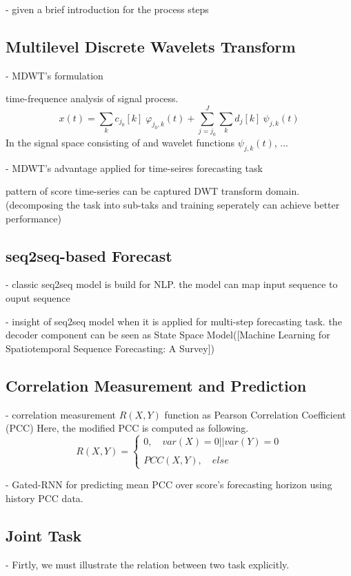 \documentclass{sigkddExp}
\begin{document}
  - given a brief introduction for the process steps


\subsection{Multilevel Discrete Wavelets Transform}

  - MDWT's formulation

time-frequence analysis of signal process.
\begin{equation}x(t)=\sum_{k}c_{j_0}[k] \; \varphi_{j_0, k}(t)+\sum_{j=j_0}^{J}\sum_{k}d_{j}[k] \ \psi_{j,k}(t) \end{equation}
In the signal space consisting of and wavelet functions $\psi_{j,k}(t)$, ...

  - MDWT's advantage applied for time-seires forecasting task

pattern of score time-series can be captured DWT transform domain. (decomposing the task into sub-taks and training seperately can achieve better performance)

\subsection{seq2seq-based Forecast}
  - classic seq2seq model is build for NLP.
the model can map input sequence to ouput sequence

  - insight of seq2seq model when it is applied for multi-step forecasting task. the decoder component can be seen as State Space Model([Machine Learning for Spatiotemporal Sequence Forecasting: A Survey])

\subsection{Correlation Measurement and Prediction}
  - correlation measurement $R(X, Y)$ function as Pearson Correlation Coefficient (PCC)
Here, the modified PCC is computed as following.
\begin{equation}
R(X, Y) = \begin{cases}
0, \quad var(X)=0 || var(Y)=0 \\\\
PCC(X, Y), \quad else
\end{cases}
\end{equation}

  - Gated-RNN for predicting mean PCC over score's forecasting horizon using history PCC data.

\subsection{Joint Task}
  - Firtly, we must illustrate the relation between two task explicitly.
\end{document}
